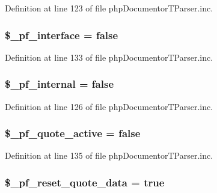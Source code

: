\-Definition at line 123 of file php\-Documentor\-T\-Parser.\-inc.

\hypertarget{classphp_documentor_t_parser_a7ca295ea098fa00d8e45c86982ee71dd}{
\subsubsection[{\$\-\_\-pf\-\_\-interface}]{\setlength{\rightskip}{0pt plus 5cm}\$\-\_\-pf\-\_\-interface = false}}\label{classphp_documentor_t_parser_a7ca295ea098fa00d8e45c86982ee71dd}


\-Definition at line 133 of file php\-Documentor\-T\-Parser.\-inc.

\hypertarget{classphp_documentor_t_parser_afdf5982b7549fcf54370acd998346e3f}{
\subsubsection[{\$\-\_\-pf\-\_\-internal}]{\setlength{\rightskip}{0pt plus 5cm}\$\-\_\-pf\-\_\-internal = false}}\label{classphp_documentor_t_parser_afdf5982b7549fcf54370acd998346e3f}


\-Definition at line 126 of file php\-Documentor\-T\-Parser.\-inc.

\hypertarget{classphp_documentor_t_parser_afa6b6c4c73356ac2788cef1e30cb34eb}{
\subsubsection[{\$\-\_\-pf\-\_\-quote\-\_\-active}]{\setlength{\rightskip}{0pt plus 5cm}\$\-\_\-pf\-\_\-quote\-\_\-active = false}}\label{classphp_documentor_t_parser_afa6b6c4c73356ac2788cef1e30cb34eb}


\-Definition at line 135 of file php\-Documentor\-T\-Parser.\-inc.

\hypertarget{classphp_documentor_t_parser_a0dbb69c8dfded9a05068866e708d4fa8}{
\subsubsection[{\$\-\_\-pf\-\_\-reset\-\_\-quote\-\_\-data}]{\setlength{\rightskip}{0pt plus 5cm}\$\-\_\-pf\-\_\-reset\-\_\-quote\-\_\-data = true}}\label{classphp_documentor_t_parser_a0dbb69c8dfded9a05068866e708d4fa8}


